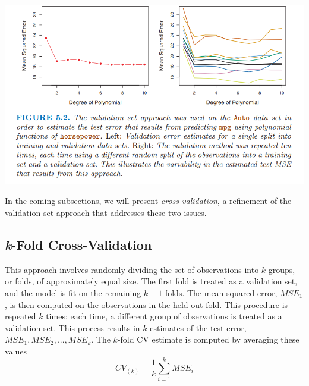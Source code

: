 \begin{center}
    \includegraphics[scale=0.7]{images/cv2.png}
\end{center}
In the coming subsections, we will present \textit{cross-validation}, a refinement of the validation set approach that addresses these two issues.

\subsection{\textit{k}-Fold Cross-Validation}
This approach involves randomly dividing the set of observations into $k$ groups, or folds, of approximately equal size. The first fold is treated as a validation set, and the model is fit on the remaining $k - 1$ folds. The mean squared error, $MSE_1$, is then computed on the observations in the held-out fold. This procedure is repeated $k$ times; each time, a different group of observations is treated as a validation set. This process results in $k$ estimates of the test error, $MSE_1, MSE_2,..., MSE_k$. The $k$-fold CV estimate is computed by averaging these values
\begin{equation}
    CV_{(k)} = \frac{1}{k} \sum_{i=1}^k MSE_i
\end{equation}


